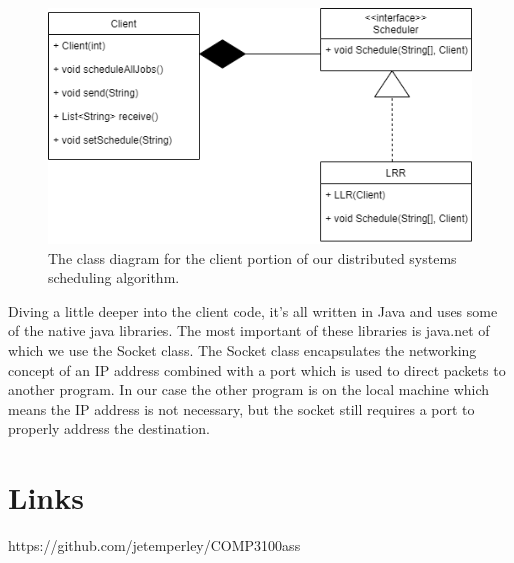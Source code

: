\documentclass[a4paper]{article} %
\begin{document}
\begin{figure}
    \centering
    \includegraphics{class.png}
    \caption{The class diagram for the client portion of our distributed systems scheduling algorithm.}
    \label{fig:class}
\end{figure}

Diving a little deeper into the client code, it’s all written in Java and uses some of the native java libraries. The most important of these libraries is java.net of which we use the Socket class. The Socket class encapsulates the networking concept of an IP address combined with a port which is used to direct packets to another program. In our case the other program is on the local machine which means the IP address is not necessary, but the socket still requires a port to properly address the destination.

\section{Links}
https://github.com/jetemperley/COMP3100ass
\end{document}
